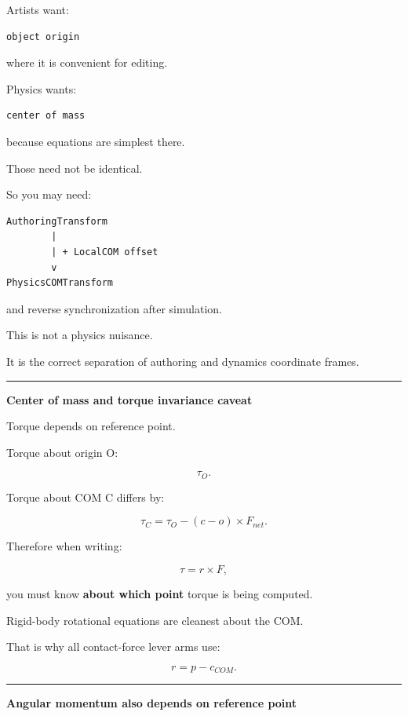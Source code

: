 Artists want:

\begin{verbatim}
object origin
\end{verbatim}

where it is convenient for editing.

Physics wants:

\begin{verbatim}
center of mass
\end{verbatim}

because equations are simplest there.

Those need not be identical.

So you may need:

\begin{verbatim}
AuthoringTransform
        |
        | + LocalCOM offset
        v
PhysicsCOMTransform
\end{verbatim}

and reverse synchronization after simulation.

This is not a physics nuisance.

It is the correct separation of authoring and dynamics coordinate frames.

\begin{center}\rule{0.5\linewidth}{0.5pt}\end{center}

\textbf{Center of mass and torque invariance caveat}

Torque depends on reference point.

Torque about origin O:

\[
\tau_O.
\]

Torque about COM C differs by:

\[
\tau_C
=
\tau_O-
(c-o)\times F_{net}.
\]

Therefore when writing:

\[
\tau=r\times F,
\]

you must know \textbf{about which point} torque is being computed.

Rigid-body rotational equations are cleanest about the COM.

That is why all contact-force lever arms use:

\[
r=p-c_{COM}.
\]

\begin{center}\rule{0.5\linewidth}{0.5pt}\end{center}

\textbf{Angular momentum also depends on reference point}

